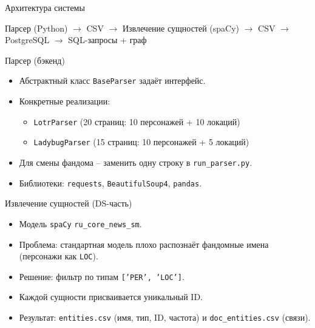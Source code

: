 \documentclass[russian, aspectratio=1610]{beamer}
\begin{document}

\begin{frame}{Архитектура системы}
    \begin{center}
        Парсер (Python) $\to$ CSV $\to$ Извлечение сущностей (spaCy) $\to$ CSV $\to$ PostgreSQL $\to$ SQL-запросы + граф
    \end{center}
\end{frame}

\begin{frame}{Парсер (бэкенд)}
    \begin{itemize}
        \item Абстрактный класс \texttt{BaseParser} задаёт интерфейс.
        \item Конкретные реализации:
            \begin{itemize}
                \item \texttt{LotrParser} (20 страниц: 10 персонажей + 10 локаций)
                \item \texttt{LadybugParser} (15 страниц: 10 персонажей + 5 локаций)
            \end{itemize}
        \item Для смены фандома – заменить одну строку в \texttt{run\_parser.py}.
        \item Библиотеки: \texttt{requests}, \texttt{BeautifulSoup4}, \texttt{pandas}.
    \end{itemize}
\end{frame}

\begin{frame}{Извлечение сущностей (DS-часть)}
    \begin{itemize}
        \item Модель \texttt{spaCy} \texttt{ru\_core\_news\_sm}.
        \item Проблема: стандартная модель плохо распознаёт фандомные имена (персонажи как \texttt{LOC}).
        \item Решение: фильтр по типам \texttt{['PER', 'LOC']}.
        \item Каждой сущности присваивается уникальный ID.
        \item Результат: \texttt{entities.csv} (имя, тип, ID, частота) и \texttt{doc\_entities.csv} (связи).
    \end{itemize}
\end{frame}
\end{document}
